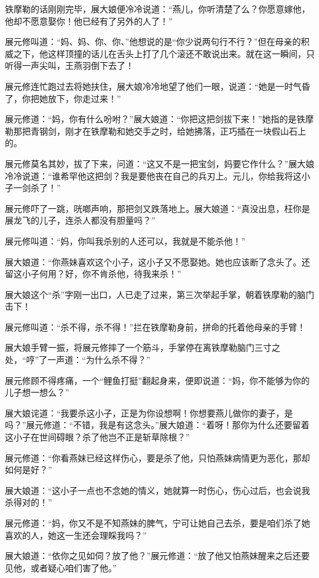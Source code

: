 \documentclass[12pt,oneside]{book}
\begin{document}
铁摩勒的话刚刚完毕，展大娘便冷冷说道：``燕儿，你听清楚了么？你愿意嫁他，他却不愿意娶你！他已经有了另外的人了！''

展元修叫道：``妈、妈、你、你、''他想说的是``你少说两句行不行？''但在母亲的积威之下，他这样顶撞的话儿在舌头上打了几个滚还不敢说出来。就在这一瞬间，只听得一声尖叫，王燕羽倒下去了！

展元修连忙跑过去将她扶住，展大娘冷冷地望了他们一眼，说道：``她是一时气昏了，你把她放下，你走过来！''

展元修道：``妈，你有什么吩咐？''展大娘道：``你把这把剑拔下来！''她指的是铁摩勒那把青钢剑，刚才在铁摩勒和她交手之时，给她拂落，正巧插在一块假山石上的。

展元修莫名其妙，拔了下来，问道：``这又不是一把宝剑，妈要它作什么？''展大娘冷冷说道：``谁希罕他这把剑？我是要他丧在自己的兵刃上。元儿，你给我将这小子一剑杀了！''

展元修吓了一跳，咣啷声响，那把剑又跌落地上。展大娘道：``真没出息，枉你是展龙飞的儿子，连杀人都没有胆量吗？''

展元修叫道：``妈，你叫我杀别的人还可以，我就是不能杀他！''

展大娘道：``你燕妹喜欢这个小子，这小子又不愿娶她。她也应该断了念头了。还留这小子何用？好，你不肯杀他，待我来杀！''

展大娘这个``杀''字刚一出口，人已走了过来，第三次举起手掌，朝着铁摩勒的脑门击下！

展元修叫道：``杀不得，杀不得！''拦在铁摩勒身前，拼命的托着他母亲的手臂！

展大娘手臂一振，将展元修摔了一个筋斗，手掌停在离铁摩勒脑门三寸之处，``哼''了一声道：``为什么杀不得？''

展元修顾不得疼痛，一个``鲤鱼打挺''翻起身来，便即说道：``妈，你不能够为你的儿子想一想么？''

展大娘诧道：``我要杀这小子，正是为你设想啊！你想要燕儿做你的妻子，是吗？''展元修道：``不错，我是有这念头。''展大娘道：``着呀！那你为什么还要留着这小子在世间碍眼？杀了他岂不正是斩草除根？''

展元修道：``你看燕妹已经这样伤心，要是杀了他，只怕燕妹病情更为恶化，那却如何是好？''

展大娘道：``这小子一点也不念她的情义，她就算一时伤心，伤心过后，也会说我杀得对的！''

展元修道：``妈，你又不是不知燕妹的脾气，宁可让她自己去杀，要是咱们杀了她喜欢的人，她这一生还会理睬我吗？''

展大娘道：``依你之见如伺？放了他？''展元修道：``放了他又怕燕妹醒来之后还要见他，或者疑心咱们害了他。''
\end{document}
